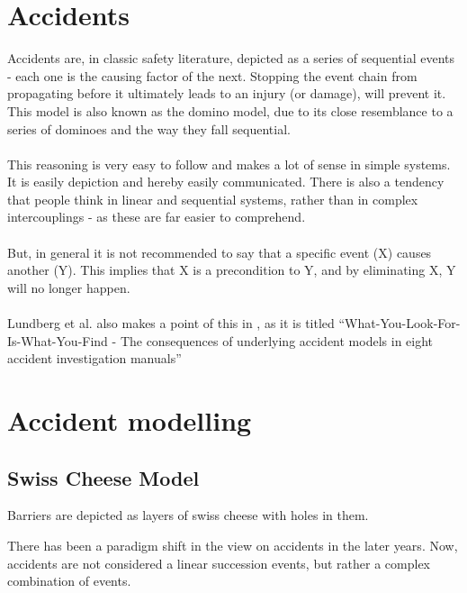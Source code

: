 \section{Accidents}
Accidents are, in classic safety literature, depicted as a series of sequential events - each one is the causing factor of the next. Stopping the event chain from propagating before it ultimately leads to an injury (or damage), will prevent it. This model is also known as the domino model, due to its close resemblance to a series of dominoes and the way they fall sequential.\\
\\
This reasoning is very easy to follow and makes a lot of sense in simple systems. It is easily depiction and hereby easily communicated. There is also a tendency that people think in linear and sequential systems, rather than in complex intercouplings - as these are far easier to comprehend.\\
\\
But, in general it is not recommended to say that a specific event (X) causes another (Y). This implies that X is a precondition to Y, and by eliminating X, Y will no longer happen\cite{sklet2002methods}.\\
\\
Lundberg et al. also makes a point of this in \cite{lundberg2009you}, as it is titled ``What-You-Look-For-Is-What-You-Find - The consequences of underlying accident models in eight accident investigation manuals''

\section{Accident modelling}

\subsection{Swiss Cheese Model}

Barriers are depicted as layers of swiss cheese with holes in them. 


There has been a paradigm shift in the view on accidents in the later years. Now, accidents are not considered a linear succession events, but rather a complex combination of events.




